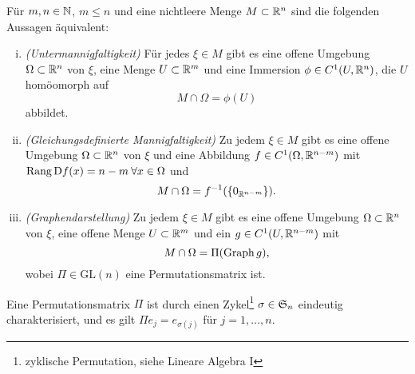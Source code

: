 \documentclass[skript.tex]{subfiles}
\begin{document}
	\begin{theorem}
		Für $m,n\in\mathbb{N}$, $m\le n$ und eine nichtleere Menge $M \subset \mathbb{R}^n$
		sind die folgenden Aussagen äquivalent:
		\begin{enumerate}[(i)]
			\item \emph{(Untermannigfaltigkeit)}\quad
			Für jedes $\xi \in M$ gibt es eine offene Umgebung $\Omega  \subset \mathbb{R}^n$
			von $\xi$, eine Menge $U \subset\mathbb{R}^{m}$ und eine Immersion $ \phi\in C^1(U,\mathbb{R}^n)$,
			die $U$ homöomorph auf
			\[
				M\cap\Omega =  \phi(U)
			\]
			abbildet.
			
			\item \begin{minipage}[t]{.55\textwidth}
				\emph{(Gleichungsdefinierte Mannigfaltigkeit)}\quad
				Zu jedem ${\xi \in M}$ gibt es eine offene Umgebung $\Omega \subset \mathbb{R}^n$ von $\xi$ und eine Abbildung $f \in C^1(\Omega,\mathbb{R}^{n-m})$ mit
				$ \operatorname{Rang} \mathrm{D} f(x)=n-m \:\forall x\in\Omega$ und
				\[
					M \cap \Omega = f^{-1}(\{0_{\mathbb{R}^{n-m}}\}).
				\]
			\end{minipage}
			\hfill
			\begin{minipage}[t][.2\textwidth][b]{.3\textwidth}
			\end{minipage}
			
			\item \emph{(Graphendarstellung)}\quad
			Zu jedem $\xi \in M$ gibt es eine offene Umgebung $\Omega \subset \mathbb{R}^n$ von $\xi$,
			eine offene Menge $U \subset\mathbb{R}^{m}$ und ein $g \in C^1(U,\mathbb{R}^{n-m})$ mit
			\[
				M\cap\Omega = \Pi(\operatorname{Graph} g),
			\]
			wobei $\Pi \in \mathrm{GL}(n)$ eine Permutationsmatrix ist.
		\end{enumerate}
	\end{theorem}
	Eine Permutationsmatrix $\Pi$ ist durch einen Zykel\footnote{zyklische Permutation, siehe Lineare Algebra I} $\sigma\in\mathfrak{S}_{n}$
	eindeutig charakterisiert, und es gilt
	$\Pi e_{j}=e_{\sigma(j)}$ für $j=1,\dotsc, n$.
\end{document}
